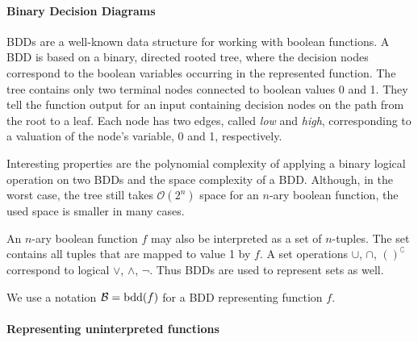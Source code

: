 \documentclass[
	digital, oneside, nosansbold, nocolorbold, nolot, nolof
]{fithesis4}
\theoremstyle{definition}
\theoremstyle{definition}
\DeclareMathOperator{\bdd}{bdd}
\begin{document}
\paragraph{Binary Decision Diagrams}

BDDs are a well-known data structure for working with boolean functions. A BDD
is based on a binary, directed rooted tree, where the decision nodes correspond
to the boolean variables occurring in the represented function. The tree
contains only two terminal nodes connected to boolean values 0 and 1. They tell
the function output for an input containing decision nodes on the path from the
root to a leaf. Each node has two edges, called \emph{low} and \emph{high},
corresponding to a valuation of the node's variable, 0 and 1, respectively.

Interesting properties are the polynomial complexity of applying a binary
logical operation on two BDDs and the space complexity of a BDD. Although, in
the worst case, the tree still takes $\mathcal{O}(2^n)$ space for an $n$-ary
boolean function, the used space is smaller in many cases.

An $n$-ary boolean function $f$ may also be interpreted as a set of $n$-tuples.
The set contains all tuples that are mapped to value 1 by $f$. A set operations
$\cup$, $\cap$, $( )^\complement$ correspond to logical $\lor$, $\land$,
$\lnot$. Thus BDDs are used to represent sets as well.

We use a notation $\bddn{B} = \bdd(f)$ for a BDD representing function $f$.

\paragraph{Representing uninterpreted functions}
\end{document}
